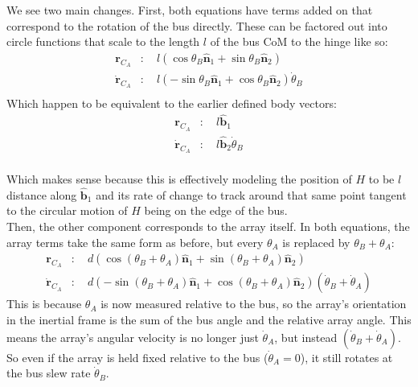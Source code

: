 \documentclass[titlepage]{article}
\begin{document}
\begin{mdframed}[linewidth=1pt, innertopmargin=10pt, innerbottommargin=10pt]
	We see two main changes. First, both equations have terms added on that correspond to the rotation of the bus directly. These can be factored out into circle functions that scale to the length $l$ of the bus CoM to the hinge like so:
	\begin{equation}
		\begin{split}
			\boldsymbol{r}_{C_A}&:\quad l\left(\cos\theta_B\hat{\boldsymbol{n}}_1+\sin\theta_B\hat{\boldsymbol{n}}_2\right) \\
			\dot{\boldsymbol{r}}_{C_A}&:\quad l\left(-\sin\theta_B\hat{\boldsymbol{n}}_1+\cos\theta_B\hat{\boldsymbol{n}}_2\right)\dot{\theta}_B \\
		\end{split}
	\end{equation}
	Which happen to be equivalent to the earlier defined body vectors:
	\begin{equation}
		\begin{split}
			\boldsymbol{r}_{C_A}&:\quad l\hat{\boldsymbol{b}}_1 \\
			\dot{\boldsymbol{r}}_{C_A}&:\quad l\hat{\boldsymbol{b}}_2\dot{\theta}_B\\
		\end{split}
	\end{equation}
	
	Which makes sense because this is effectively modeling the position of $H$ to be $l$ distance along $\hat{\boldsymbol{b}}_1$ and its rate of change to track around that same point tangent to the circular motion of $H$ being on the edge of the bus.\\
	
		Then, the other component corresponds to the array itself. In both equations, the array terms take the same form as before, but every $\theta_A$ is replaced by $\theta_B+\theta_A$:
	\begin{equation}
		\begin{split}
			\boldsymbol{r}_{C_A}&:\quad d\left(\cos(\theta_B+\theta_A)\hat{\boldsymbol{n}}_1+\sin(\theta_B+\theta_A)\hat{\boldsymbol{n}}_2\right) \\
			\dot{\boldsymbol{r}}_{C_A}&:\quad d\left(-\sin(\theta_B+\theta_A)\hat{\boldsymbol{n}}_1+\cos(\theta_B+\theta_A)\hat{\boldsymbol{n}}_2\right)\left(\dot{\theta}_B+\dot{\theta}_A\right)
		\end{split}
	\end{equation}
	This is because $\theta_A$ is now measured relative to the bus, so the array's orientation in the inertial frame is the sum of the bus angle and the relative array angle. This means the array's angular velocity is no longer just $\dot{\theta}_A$, but instead $(\dot{\theta}_B+\dot{\theta}_A)$. So even if the array is held fixed relative to the bus ($\dot{\theta}_A=0$), it still rotates at the bus slew rate $\dot{\theta}_B$.\\
\end{mdframed}
\end{document}

